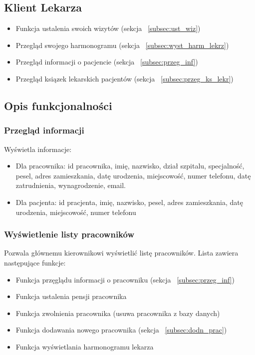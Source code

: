 \begin{flushleft}
    \subsection{\large{Klient Lekarza\label{subsec:lekarz}}}
    \begin{itemize}
        \item{Funkcja ustalenia swoich wizytów (sekcja ~\ref{subsec:ust_wiz})}
        \item{Przegląd swojego harmonogramu (sekcja ~\ref{subsec:wyst_harm_lekrz})}
        \item{Przegląd informacji o pacjencie (sekcja ~\ref{subsec:przeg_inf})}
        \item{Przegląd ksiązek lekarskich pacjentów (sekcja ~\ref{subsec:przeg_ks_lekr})}
    \end{itemize}
\end{flushleft}

\begin{flushleft}
    \subsection{\Large{Opis funkcjonalności}}
    \subsubsection{\large{Przegląd informacji}\label{subsec:przeg_inf}}
    Wyświetla informacje:
    \begin{itemize}
        \item{Dla pracownika: id pracownika, imię, nazwisko, dział szpitalu, specjalność, pesel, adres zamieszkania, datę urodzenia, miejscowość, numer telefonu, datę zatrudnienia, wynagrodzenie, email.}
        \item{Dla pacjenta: id pracjenta, imię, nazwisko, pesel, adres zamieszkania, datę urodzenia, miejscowość, numer telefonu}\label{item:info}
    \end{itemize}
\end{flushleft}

\begin{flushleft}
    \subsubsection{\large{Wyświetlenie listy pracowników}\label{subsec:wyst_prac}}
    Pozwala głównemu kierownikowi wyświetlić listę pracowników. Lista zawiera następujące funkcje:
    \begin{itemize}
        \item Funkcja przęglądu informacji o pracowniku (sekcja ~\ref{subsec:przeg_inf})
        \item Funkcja ustalenia pensji pracownika\label{item:pens_prac}
        \item Funkcja zwolnienia pracownika (usuwa pracownika z bazy danych)
        \item Funkcja dodawania nowego pracownika (sekcja ~\ref{subsec:dodn_prac})
        \item Funkcja wyświetlania harmonogramu lekarza
    \end{itemize}
\end{flushleft}

